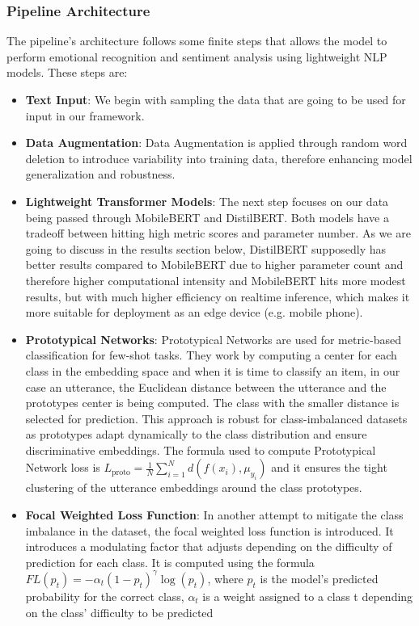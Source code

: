 \documentclass[a4paper,12pt]{article}
\begin{document}
\subsubsection{Pipeline Architecture}
The pipeline's architecture follows some finite steps that allows the model to perform emotional recognition and sentiment analysis using lightweight NLP models. These steps are:

\begin{itemize}
    \item{\textbf{Text Input}}: We begin with sampling the data that are going to be used for input in our framework.
    \item {\textbf{Data Augmentation}}: Data Augmentation is applied through random word deletion to introduce variability into training data, therefore enhancing model generalization and robustness.
    \item {\textbf{Lightweight Transformer Models}}: The next step focuses on our data being passed through MobileBERT and DistilBERT. Both models have a tradeoff between hitting high metric scores and parameter number. As we are going to discuss in the results section below, DistilBERT supposedly has better results compared to MobileBERT due to higher parameter count and therefore higher computational intensity and MobileBERT hits more modest results,
        but with much higher efficiency on realtime inference, which makes it more suitable for deployment as an edge device (e.g. mobile phone).
    \item{\textbf{Prototypical Networks}}: Prototypical Networks are used for metric-based classification for few-shot tasks. They work by computing a center for each class in the embedding space and when it is time to classify an item, in our case an utterance, the Euclidean distance between the utterance and the prototypes center is being computed. The class with the smaller distance is selected for prediction. This approach is robust for class-imbalanced datasets as
        prototypes adapt dynamically to the class distribution and ensure discriminative embeddings. The formula used to compute Prototypical Network loss is $L_{\mathrm{proto}} = \frac{1}{N} \sum_{i=1}^{N} d\!\left(f(x_i), \mu_{y_i}\right)$ and it ensures the tight clustering of the utterance embeddings around the class prototypes.
    \item{\textbf{Focal Weighted Loss Function}}: In another attempt to mitigate the class imbalance in the dataset, the focal weighted loss function is introduced. It introduces a modulating factor that adjusts depending on the difficulty of prediction for each class. It is computed using the formula $FL(p_t) = -\alpha_t (1 - p_t)^{\gamma} \log(p_t)$, where $p_t$ is the model's predicted probability for the correct class, $\alpha_t$ is a weight assigned to a class t depending on the class' difficulty to be predicted

\end{itemize}
\end{document}
